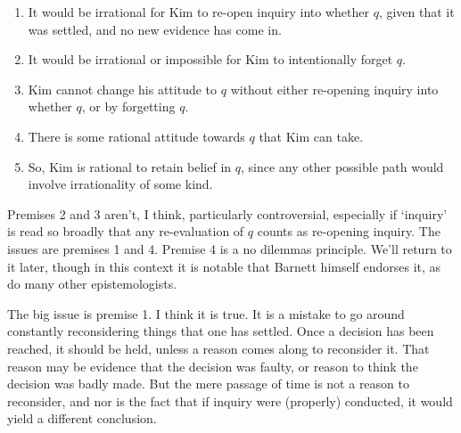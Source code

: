 \begin{enumerate}
\item It would be irrational for Kim to re-open inquiry into whether $q$, given that it was settled, and no new evidence has come in.

\item It would be irrational or impossible for Kim to intentionally forget $q$.

\item Kim cannot change his attitude to $q$ without either re-opening inquiry into whether $q$, or by forgetting $q$.

\item There is some rational attitude towards $q$ that Kim can take.

\item So, Kim is rational to retain belief in $q$, since any other possible path would involve irrationality of some kind.

\end{enumerate}
Premises 2 and 3 aren't, I think, particularly controversial, especially if `inquiry' is read so broadly that any re-evaluation of $q$ counts as re-opening inquiry. The issues are premises 1 and 4. Premise 4 is a no dilemmas principle. We'll return to it later, though in this context it is notable that Barnett himself endorses it, as do many other epistemologists. ~\citep[10]{Barnett2015}

The big issue is premise 1. I think it is true. It is a mistake to go around constantly reconsidering things that one has settled. Once a decision has been reached, it should be held, unless a reason comes along to reconsider it. That reason may be evidence that the decision was faulty, or reason to think the decision was badly made. But the mere passage of time is not a reason to reconsider, and nor is the fact that if inquiry were (properly) conducted, it would yield a different conclusion.

